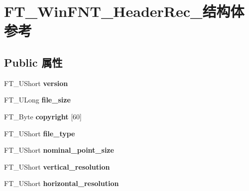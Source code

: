 \hypertarget{struct_f_t___win_f_n_t___header_rec__}{}\section{F\+T\+\_\+\+Win\+F\+N\+T\+\_\+\+Header\+Rec\+\_\+结构体 参考}
\label{struct_f_t___win_f_n_t___header_rec__}
\subsection*{Public 属性}
\begin{DoxyCompactItemize}
\item 
\mbox{\label{struct_f_t___win_f_n_t___header_rec___a88f8539fc11d2fac60f172553caa5b8d}} 
F\+T\+\_\+\+U\+Short {\bfseries version}
\item 
\mbox{\label{struct_f_t___win_f_n_t___header_rec___ae311838f941463d96f4ee570de58a359}} 
F\+T\+\_\+\+U\+Long {\bfseries file\+\_\+size}
\item 
\mbox{\label{struct_f_t___win_f_n_t___header_rec___a289a835480eac30710dae8bfc04c6ae7}} 
F\+T\+\_\+\+Byte {\bfseries copyright} \mbox{[}60\mbox{]}
\item 
\mbox{\label{struct_f_t___win_f_n_t___header_rec___a0ca7a317967750673fd06f98af5f8329}} 
F\+T\+\_\+\+U\+Short {\bfseries file\+\_\+type}
\item 
\mbox{\label{struct_f_t___win_f_n_t___header_rec___a98fd9a9f31cdbdfa570fba3e0094dfdc}} 
F\+T\+\_\+\+U\+Short {\bfseries nominal\+\_\+point\+\_\+size}
\item 
\mbox{\label{struct_f_t___win_f_n_t___header_rec___ad8f76384c2eec492a559e66de170baba}} 
F\+T\+\_\+\+U\+Short {\bfseries vertical\+\_\+resolution}
\item 
\mbox{\label{struct_f_t___win_f_n_t___header_rec___a0adc07f0f285c8c2350c0078d71ace9a}} 
F\+T\+\_\+\+U\+Short {\bfseries horizontal\+\_\+resolution}

\end{DoxyCompactItemize}
